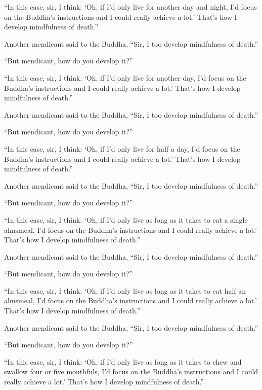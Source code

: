 \documentclass[12pt,openany]{book}%
\begin{document}
“In this case, sir, I think: ‘Oh, if I’d only live for another day and night, I’d focus on the Buddha’s instructions and I could really achieve a lot.’ That’s how I develop mindfulness of death.” 

Another mendicant said to the Buddha, “Sir, I too develop mindfulness of death.” 

“But mendicant, how do you develop it?” 

“In this case, sir, I think: ‘Oh, if I’d only live for another day, I’d focus on the Buddha’s instructions and I could really achieve a lot.’ That’s how I develop mindfulness of death.” 

Another mendicant said to the Buddha, “Sir, I too develop mindfulness of death.” 

“But mendicant, how do you develop it?” 

“In this case, sir, I think: ‘Oh, if I’d only live for half a day, I’d focus on the Buddha’s instructions and I could really achieve a lot.’ That’s how I develop mindfulness of death.” 

Another mendicant said to the Buddha, “Sir, I too develop mindfulness of death.” 

“But mendicant, how do you develop it?” 

“In this case, sir, I think: ‘Oh, if I’d only live as long as it takes to eat a single almsmeal, I’d focus on the Buddha’s instructions and I could really achieve a lot.’ That’s how I develop mindfulness of death.” 

Another mendicant said to the Buddha, “Sir, I too develop mindfulness of death.” 

“But mendicant, how do you develop it?” 

“In this case, sir, I think: ‘Oh, if I’d only live as long as it takes to eat half an almsmeal, I’d focus on the Buddha’s instructions and I could really achieve a lot.’ That’s how I develop mindfulness of death.” 

Another mendicant said to the Buddha, “Sir, I too develop mindfulness of death.” 

“But mendicant, how do you develop it?” 

“In this case, sir, I think: ‘Oh, if I’d only live as long as it takes to chew and swallow four or five mouthfuls, I’d focus on the Buddha’s instructions and I could really achieve a lot.’ That’s how I develop mindfulness of death.” 
\end{document}
